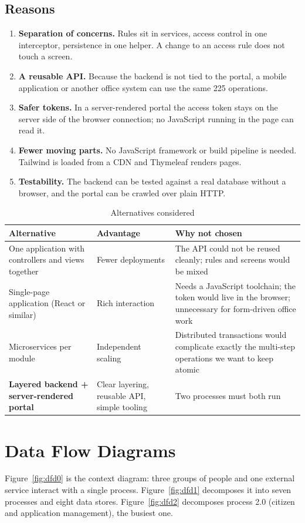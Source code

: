 \subsection{Reasons}
\begin{enumerate}
\item \textbf{Separation of concerns.} Rules sit in services, access control in one interceptor, persistence in one helper. A change to an access rule does not touch a screen.
\item \textbf{A reusable API.} Because the backend is not tied to the portal, a mobile application or another office system can use the same 225 operations.
\item \textbf{Safer tokens.} In a server-rendered portal the access token stays on the server side of the browser connection; no JavaScript running in the page can read it.
\item \textbf{Fewer moving parts.} No JavaScript framework or build pipeline is needed. Tailwind is loaded from a CDN and Thymeleaf renders pages.
\item \textbf{Testability.} The backend can be tested against a real database without a browser, and the portal can be crawled over plain HTTP.
\end{enumerate}

\begin{table}[H]
\centering\small
\caption{Alternatives considered}\label{tab:alt}
\begin{tabularx}{\linewidth}{@{}p{3.6cm}XX@{}}
\toprule \textbf{Alternative} & \textbf{Advantage} & \textbf{Why not chosen}\\ \midrule
One application with controllers and views together & Fewer deployments & The API could not be reused cleanly; rules and screens would be mixed\\
Single-page application (React or similar) & Rich interaction & Needs a JavaScript toolchain; the token would live in the browser; unnecessary for form-driven office work\\
Microservices per module & Independent scaling & Distributed transactions would complicate exactly the multi-step operations we want to keep atomic\\
\textbf{Layered backend + server-rendered portal} & Clear layering, reusable API, simple tooling & Two processes must both run\\
\bottomrule
\end{tabularx}
\end{table}

\section{Data Flow Diagrams}
Figure~\ref{fig:dfd0} is the context diagram: three groups of people and one external
service interact with a single process. Figure~\ref{fig:dfd1} decomposes it into seven
processes and eight data stores. Figure~\ref{fig:dfd2} decomposes process 2.0 (citizen
and application management), the busiest one.

